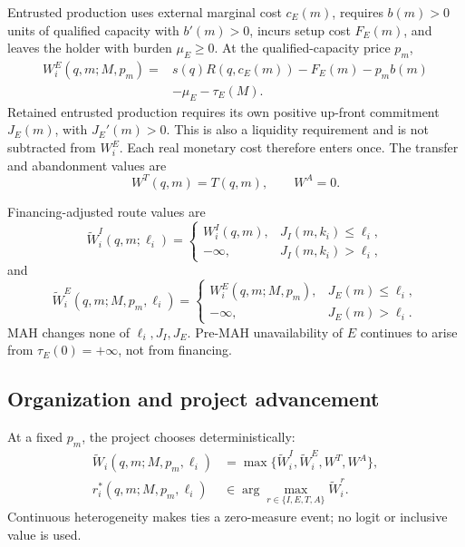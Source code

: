 \documentclass[12pt]{article}
\newcommand{\1}{\mathbf{1}}
\begin{document}
Entrusted production uses external marginal cost \(c_E(m)\), requires
\(b(m)>0\) units of qualified capacity with \(b'(m)>0\), incurs setup cost
\(F_E(m)\), and leaves the holder with burden \(\mu_E\geq0\). At the
qualified-capacity price \(p_m\),
\begin{equation}
  \begin{aligned}
  W_i^E(q,m;M,p_m)
  ={}&
  s(q)R\!\left(q,c_E(m)\right)-F_E(m)-p_mb(m)\\
  &-\mu_E-\tau_E(M).
  \end{aligned}
  \label{eq:p16m-entrusted}
\end{equation}
Retained entrusted production requires its own positive up-front commitment
\(J_E(m)\), with \(J_E'(m)>0\). This is also a liquidity requirement and is
not subtracted from \(W_i^E\). Each real monetary cost therefore enters once.
The transfer and abandonment values are
\begin{equation}
  W^T(q,m)=T(q,m),
  \qquad
  W^A=0.
  \label{eq:p16m-outside}
\end{equation}

Financing-adjusted route values are
\begin{equation}
  \widetilde W_i^I(q,m;\ell_i)
  =
  \begin{cases}
    W_i^I(q,m), & J_I(m,k_i)\leq\ell_i,\\
    -\infty, & J_I(m,k_i)>\ell_i,
  \end{cases}
  \label{eq:p16m-finance-adjusted-internal}
\end{equation}
and
\begin{equation}
  \widetilde W_i^E(q,m;M,p_m,\ell_i)
  =
  \begin{cases}
    W_i^E(q,m;M,p_m), & J_E(m)\leq\ell_i,\\
    -\infty, & J_E(m)>\ell_i.
  \end{cases}
  \label{eq:p16m-finance-adjusted-entrusted}
\end{equation}
MAH changes none of \(\ell_i,J_I,J_E\). Pre-MAH unavailability of \(E\)
continues to arise from \(\tau_E(0)=+\infty\), not from financing.

\subsection{Organization and project advancement}
\label{subsec:p16m-organization}

At a fixed \(p_m\), the project chooses deterministically:
\begin{equation}
  \begin{aligned}
  \widetilde W_i(q,m;M,p_m,\ell_i)
  &=
  \max\{\widetilde W_i^I,\widetilde W_i^E,W^T,W^A\},\\
  r_i^*(q,m;M,p_m,\ell_i)
  &\in
  \arg\max_{r\in\{I,E,T,A\}} \widetilde W_i^r.
  \end{aligned}
  \label{eq:p16m-route-choice}
\end{equation}
Continuous heterogeneity makes ties a zero-measure event; no logit or
inclusive value is used.
\end{document}
